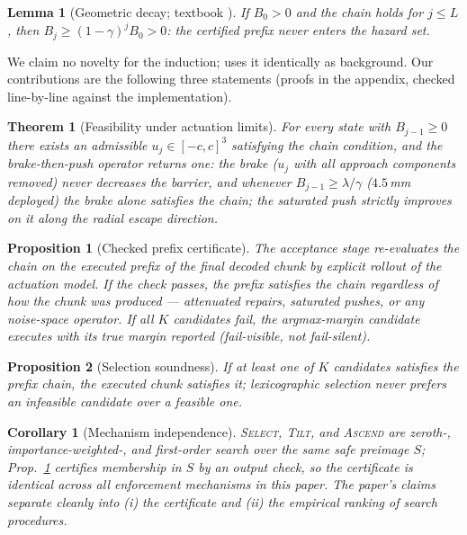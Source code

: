 \documentclass[conference]{IEEEtran}
\newtheorem{theorem}{Theorem}
\newtheorem{proposition}{Proposition}
\newtheorem{lemma}{Lemma}
\newtheorem{corollary}{Corollary}
\begin{document}
\begin{lemma}[Geometric decay; textbook \cite{agrawal2017dcbf}]
If $B_0>0$ and the chain holds for $j\le L$, then $B_j\ge(1-\gamma)^jB_0>0$: the certified prefix never enters the hazard set.
\end{lemma}

We claim no novelty for the induction; \cite{sota2607} uses it identically as background. Our contributions are the following three statements (proofs in the appendix, checked line-by-line against the implementation).

\begin{theorem}[Feasibility under actuation limits]\label{thm:feas}
For every state with $B_{j-1}\ge0$ there exists an admissible $u_j\in[-c,c]^3$ satisfying the chain condition, and the brake-then-push operator returns one: the brake ($u_j$ with all approach components removed) never decreases the barrier, and whenever $B_{j-1}\ge\lambda/\gamma$ ($4.5$\,mm deployed) the brake alone satisfies the chain; the saturated push strictly improves on it along the radial escape direction.
\end{theorem}

\begin{proposition}[Checked prefix certificate]\label{prop:cert}
The acceptance stage re-evaluates the chain on the executed prefix of the \emph{final decoded chunk} by explicit rollout of the actuation model. If the check passes, the prefix satisfies the chain \emph{regardless of how the chunk was produced} --- attenuated repairs, saturated pushes, or any noise-space operator. If all $K$ candidates fail, the argmax-margin candidate executes with its true margin reported (fail-visible, not fail-silent).
\end{proposition}

\begin{proposition}[Selection soundness]\label{prop:select}
If at least one of $K$ candidates satisfies the prefix chain, the executed chunk satisfies it; lexicographic selection never prefers an infeasible candidate over a feasible one.
\end{proposition}

\begin{corollary}[Mechanism independence]\label{cor:mech}
\textsc{Select}, \textsc{Tilt}, and \textsc{Ascend} are zeroth-, importance-weighted-, and first-order search over the same safe preimage $S$; Prop.~\ref{prop:cert} certifies membership in $S$ by an output check, so the certificate is identical across all enforcement mechanisms in this paper. The paper's claims separate cleanly into (i) the certificate and (ii) the empirical ranking of search procedures.
\end{corollary}
\end{document}
